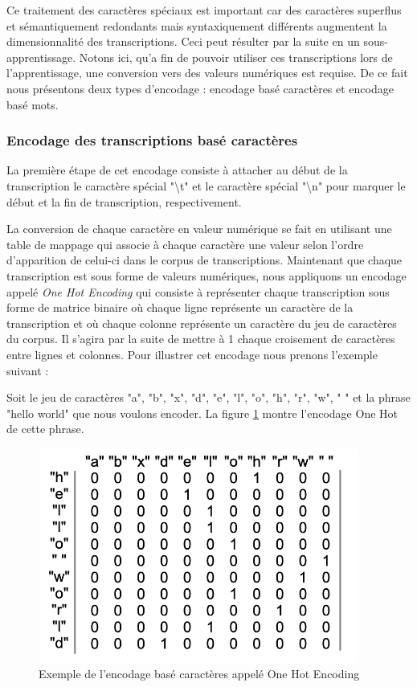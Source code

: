 Ce traitement des caractères spéciaux est important car des caractères superflus et sémantiquement redondants mais syntaxiquement différents augmentent la dimensionnalité des transcriptions. Ceci peut résulter par la suite en un sous-apprentissage. Notons ici, qu'a fin de pouvoir utiliser ces transcriptions lors de l'apprentissage, une conversion vers des valeurs numériques est requise. De ce fait nous présentons deux types d'encodage : encodage basé caractères et encodage basé mots.

\subsubsection{Encodage des transcriptions basé caractères} \label{character_based}
La première étape de cet encodage consiste à attacher au début de la transcription le caractère spécial "\textbackslash t" et le caractère spécial "\textbackslash n" pour marquer le début et la fin de transcription, respectivement.

La conversion de chaque caractère en valeur numérique se fait en utilisant une table de mappage qui associe à chaque caractère une valeur selon l'ordre d'apparition de celui-ci dans le corpus de transcriptions. Maintenant que chaque transcription est sous forme de valeurs numériques, nous appliquons un encodage appelé \textit{One Hot Encoding} \cite{textencoding} qui consiste à représenter chaque transcription sous forme de matrice binaire où chaque ligne représente un caractère de la transcription et où chaque colonne représente un caractère du jeu de caractères du corpus. Il s'agira par la suite de mettre à 1 chaque croisement de caractères entre lignes et colonnes. Pour illustrer cet encodage nous prenons l'exemple suivant : 

Soit le jeu de caractères "a", "b", "x", "d", "e", "l", "o", "h", "r", "w", " " et la phrase "hello world" que nous voulons encoder. La figure \ref{One-hot-car} montre l'encodage One Hot de cette phrase.

\begin{figure}[H]
    \centering
    \includegraphics[height=200pt,width=300pt]{images/chap3/matrice_one_hot.png}
    \caption{Exemple de l'encodage basé caractères appelé One Hot Encoding}
    \label{One-hot-car}
\end{figure}

